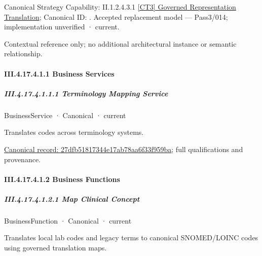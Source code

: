 {\small Canonical Strategy Capability: II.1.2.4.3.1 \hyperref[element:bfaeedaf94c54505bc0616e4653b5767]{[CT3] Governed Representation Translation}; Canonical ID: \texttt{}. Accepted replacement model — Pass3/014; implementation unverified · current.}\par
Contextual reference only; no additional architectural instance or semantic relationship.\par
\paragraph*{III.4.17.4.1.1 Business Services}
\label{navigation:III.4.17.4.1.1}

\subparagraph*{III.4.17.4.1.1.1 Terminology Mapping Service}
\label{navigation:III.4.17.4.1.1.1}

\label{element:27dfb51817344e17ab78aa6f33f959ba}
{\small BusinessService · Canonical · current}\par

Translates codes across terminology systems.


{\footnotesize \href{../../../../../../../continuum/business/business-service/27dfb51817344e17ab78aa6f33f959ba.md}{Canonical record: 27dfb51817344e17ab78aa6f33f959ba}; full qualifications and provenance.}\par
\paragraph*{III.4.17.4.1.2 Business Functions}
\label{navigation:III.4.17.4.1.2}

\subparagraph*{III.4.17.4.1.2.1 Map Clinical Concept}
\label{navigation:III.4.17.4.1.2.1}

\label{element:9549208d56cd47d8a9ba4e586323ef3b}
{\small BusinessFunction · Canonical · current}\par

Translates local lab codes and legacy terms to canonical SNOMED/LOINC codes using governed translation maps.


